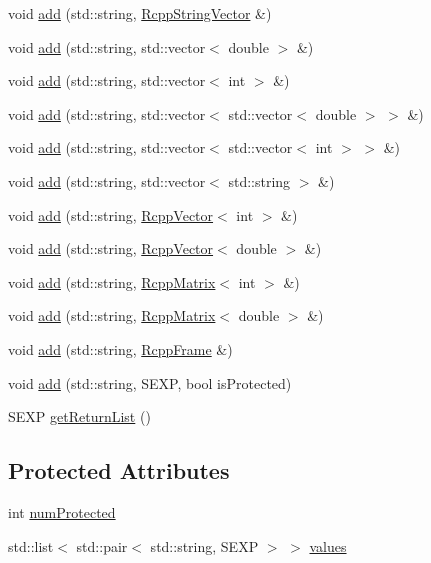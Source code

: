 \begin{CompactItemize}
void \hyperlink{classRcppResultSet_10d01a24ef006c1ff14ca7e95fb9e0ea}{add} (std::string, \hyperlink{classRcppStringVector}{RcppStringVector} \&)
\item 
void \hyperlink{classRcppResultSet_2b4575ca5ccc390bc5437b1be4718ca6}{add} (std::string, std::vector$<$ double $>$ \&)
\item 
void \hyperlink{classRcppResultSet_23fa5be81281adcf3014749094816522}{add} (std::string, std::vector$<$ int $>$ \&)
\item 
void \hyperlink{classRcppResultSet_b10cd8503c12708e27068b92a83e4047}{add} (std::string, std::vector$<$ std::vector$<$ double $>$ $>$ \&)
\item 
void \hyperlink{classRcppResultSet_b51f30f4bd5f3c6153221a3bd7bb7e24}{add} (std::string, std::vector$<$ std::vector$<$ int $>$ $>$ \&)
\item 
void \hyperlink{classRcppResultSet_db4236a049c8dceb7112229f5e68a295}{add} (std::string, std::vector$<$ std::string $>$ \&)
\item 
void \hyperlink{classRcppResultSet_068cb13e27c0e26dd05e92d67eaeb7d0}{add} (std::string, \hyperlink{classRcppVector}{RcppVector}$<$ int $>$ \&)
\item 
void \hyperlink{classRcppResultSet_10a64eb042cd3bac5b635670ae2fff5d}{add} (std::string, \hyperlink{classRcppVector}{RcppVector}$<$ double $>$ \&)
\item 
void \hyperlink{classRcppResultSet_56f1bff720a6cf6503ab942bdb6892b3}{add} (std::string, \hyperlink{classRcppMatrix}{RcppMatrix}$<$ int $>$ \&)
\item 
void \hyperlink{classRcppResultSet_f6f50ca0a589fc12ef68c0406e83243b}{add} (std::string, \hyperlink{classRcppMatrix}{RcppMatrix}$<$ double $>$ \&)
\item 
void \hyperlink{classRcppResultSet_9e05fb2ca92258529ffbb536e23a2a4d}{add} (std::string, \hyperlink{classRcppFrame}{RcppFrame} \&)
\item 
void \hyperlink{classRcppResultSet_5f44a63a2cab43db551c0e27d6fec378}{add} (std::string, SEXP, bool isProtected)
\item 
SEXP \hyperlink{classRcppResultSet_916989ff6c0ed1149a5f93fb6a532946}{getReturnList} ()
\end{CompactItemize}
\subsection*{Protected Attributes}
\begin{CompactItemize}
\item 
int \hyperlink{classRcppResultSet_19edd02ac05783f9b4fd840c22e74153}{numProtected}
\item 
std::list$<$ std::pair$<$ std::string, SEXP $>$ $>$ \hyperlink{classRcppResultSet_509f3d779c88476dea89ade9c08d403f}{values}
\end{CompactItemize}


